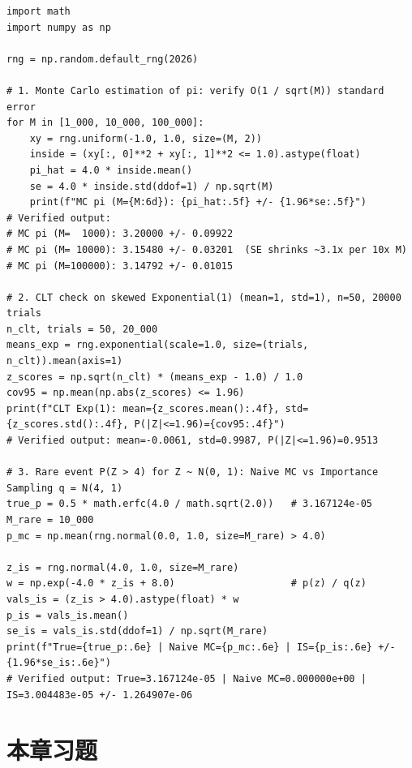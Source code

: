 \begin{lstlisting}[caption={蒙特卡洛估 $\pi$、指数分布 CLT 验证与 $\Prob(Z>4)$ 重要性采样（纯 NumPy）},label={lst:ch3-mc-is}]
import math
import numpy as np

rng = np.random.default_rng(2026)

# 1. Monte Carlo estimation of pi: verify O(1 / sqrt(M)) standard error
for M in [1_000, 10_000, 100_000]:
    xy = rng.uniform(-1.0, 1.0, size=(M, 2))
    inside = (xy[:, 0]**2 + xy[:, 1]**2 <= 1.0).astype(float)
    pi_hat = 4.0 * inside.mean()
    se = 4.0 * inside.std(ddof=1) / np.sqrt(M)
    print(f"MC pi (M={M:6d}): {pi_hat:.5f} +/- {1.96*se:.5f}")
# Verified output:
# MC pi (M=  1000): 3.20000 +/- 0.09922
# MC pi (M= 10000): 3.15480 +/- 0.03201  (SE shrinks ~3.1x per 10x M)
# MC pi (M=100000): 3.14792 +/- 0.01015

# 2. CLT check on skewed Exponential(1) (mean=1, std=1), n=50, 20000 trials
n_clt, trials = 50, 20_000
means_exp = rng.exponential(scale=1.0, size=(trials, n_clt)).mean(axis=1)
z_scores = np.sqrt(n_clt) * (means_exp - 1.0) / 1.0
cov95 = np.mean(np.abs(z_scores) <= 1.96)
print(f"CLT Exp(1): mean={z_scores.mean():.4f}, std={z_scores.std():.4f}, P(|Z|<=1.96)={cov95:.4f}")
# Verified output: mean=-0.0061, std=0.9987, P(|Z|<=1.96)=0.9513

# 3. Rare event P(Z > 4) for Z ~ N(0, 1): Naive MC vs Importance Sampling q = N(4, 1)
true_p = 0.5 * math.erfc(4.0 / math.sqrt(2.0))   # 3.167124e-05
M_rare = 10_000
p_mc = np.mean(rng.normal(0.0, 1.0, size=M_rare) > 4.0)

z_is = rng.normal(4.0, 1.0, size=M_rare)
w = np.exp(-4.0 * z_is + 8.0)                    # p(z) / q(z)
vals_is = (z_is > 4.0).astype(float) * w
p_is = vals_is.mean()
se_is = vals_is.std(ddof=1) / np.sqrt(M_rare)
print(f"True={true_p:.6e} | Naive MC={p_mc:.6e} | IS={p_is:.6e} +/- {1.96*se_is:.6e}")
# Verified output: True=3.167124e-05 | Naive MC=0.000000e+00 | IS=3.004483e-05 +/- 1.264907e-06
\end{lstlisting}

\section{本章习题}
\label{sec:ch3-exercises}


